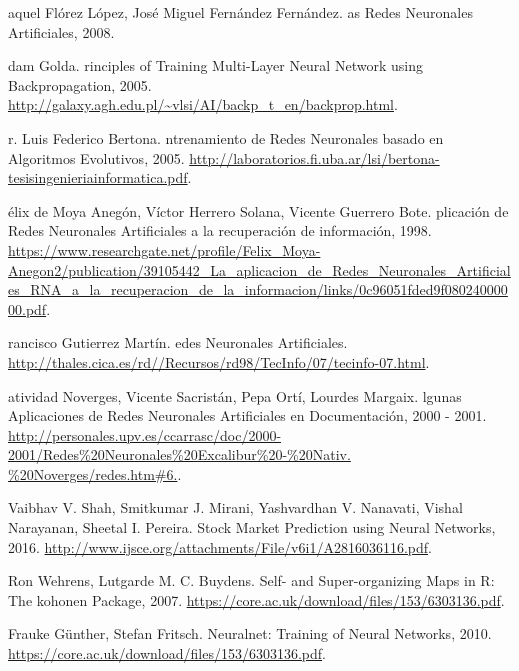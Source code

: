 \documentclass[journal]{IEEEtran}
\begin{document}
\begin{thebibliography}{0}

aquel {F}lórez {L}ópez, {J}osé {M}iguel {F}ernández {F}ernández.
as {R}edes {N}euronales {A}rtificiales, 2008.

dam {G}olda.
rinciples of {T}raining {M}ulti-{L}ayer {N}eural {N}etwork using {B}ackpropagation, 2005.
\url{http://galaxy.agh.edu.pl/~vlsi/AI/backp_t_en/backprop.html}.

r. {L}uis {F}ederico {B}ertona.
ntrenamiento de {R}edes {N}euronales basado en {A}lgoritmos {E}volutivos, 2005. 
\url{http://laboratorios.fi.uba.ar/lsi/bertona-tesisingenieriainformatica.pdf}.

élix de {M}oya {A}negón, {V}íctor {H}errero {S}olana, {V}icente {G}uerrero {B}ote.
plicación de {R}edes {N}euronales {A}rtificiales a la recuperación de información, 1998. 
\url{https://www.researchgate.net/profile/Felix_Moya-Anegon2/publication/39105442_La_aplicacion_de_Redes_Neuronales_Artificiales_RNA_a_la_recuperacion_de_la_informacion/links/0c96051fded9f08024000000.pdf}.

rancisco {G}utierrez {M}artín.
edes {N}euronales {A}rtificiales. 
\url{http://thales.cica.es/rd//Recursos/rd98/TecInfo/07/tecinfo-07.html}.


atividad {N}overges, {V}icente {S}acristán, {P}epa {O}rtí, {L}ourdes {M}argaix.
lgunas {A}plicaciones de {R}edes {N}euronales {A}rtificiales en {D}ocumentación, 2000 - 2001.
\url{http://personales.upv.es/ccarrasc/doc/2000-2001/Redes\%20Neuronales\%20Excalibur\%20-\%20Nativ. \%20Noverges/redes.htm#6.}.

\newblock Vaibhav V. Shah, Smitkumar J. Mirani, Yashvardhan V. Nanavati, Vishal Narayanan, Sheetal I. Pereira.
\newblock Stock Market Prediction using Neural Networks, 2016. 
\url{http://www.ijsce.org/attachments/File/v6i1/A2816036116.pdf}.

\newblock Ron Wehrens, Lutgarde M. C. Buydens.
\newblock Self- and Super-organizing Maps in R: The kohonen Package, 2007.
\url{https://core.ac.uk/download/files/153/6303136.pdf}.

\newblock  Frauke Günther, Stefan Fritsch.
\newblock Neuralnet: Training of Neural Networks, 2010.
\url{https://core.ac.uk/download/files/153/6303136.pdf}.
\end{thebibliography}
\end{document}
